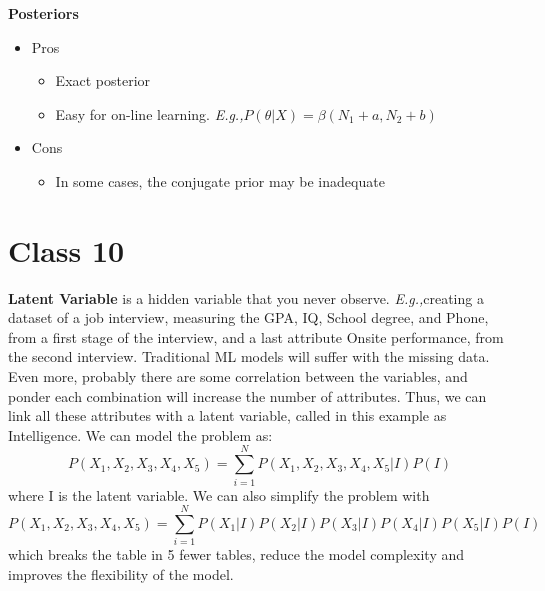 \documentclass{article}
\newcommand{\Eg}{\textit{E.g.,}}
\begin{document}
\textbf{Posteriors}
\begin{itemize}
    \item Pros \begin{itemize}
        \item Exact posterior
        \item Easy for on-line learning. \Eg $P(\theta|X) = \beta(N_1 + a, N_2 + b)$
    \end{itemize}
    
    \item Cons \begin{itemize}
        \item In some cases, the conjugate prior may be inadequate
    \end{itemize}
\end{itemize}

\section{Class 10}
\textbf{Latent Variable} is a hidden variable that you never observe.
\Eg creating a dataset of a job interview, measuring the GPA, IQ, School degree, and Phone, from a first stage of the interview, and a last attribute Onsite performance, from the second interview. Traditional ML models will suffer with the missing data. Even more, probably there are some correlation between the variables, and ponder each combination will increase the number of attributes. Thus, we can link all these attributes with a latent variable, called in this example as Intelligence. We can model the problem as:
\begin{equation}
    P(X_1, X_2, X_3, X_4, X_5) = \sum_{i=1}^N P(X_1, X_2, X_3, X_4, X_5|I)P(I)
\end{equation}
where I is the latent variable. We can also simplify the problem with
\begin{equation}
    P(X_1, X_2, X_3, X_4, X_5) = \sum_{i=1}^N P(X_1|I)P(X_2|I)P(X_3|I)P(X_4|I)P(X_5|I)P(I)
\end{equation}
which breaks the table in 5 fewer tables, reduce the model complexity and improves the flexibility of the model.
\end{document}
